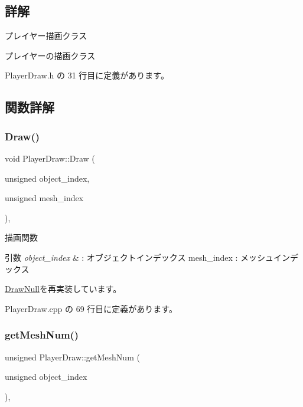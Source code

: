 \subsection{詳解}
プレイヤー描画クラス 

プレイヤーの描画クラス 

 Player\+Draw.\+h の 31 行目に定義があります。



\subsection{関数詳解}
\mbox{\label{class_player_draw_a8b9e8caa6bea7295f58a0aaddeb9458b}} 
\subsubsection{\texorpdfstring{Draw()}{Draw()}}
{\footnotesize\ttfamily void Player\+Draw\+::\+Draw (\begin{DoxyParamCaption}\item[{unsigned}]{object\+\_\+index,  }\item[{unsigned}]{mesh\+\_\+index }\end{DoxyParamCaption})\hspace{0.3cm}{\ttfamily [override]}, {\ttfamily [virtual]}}



描画関数 


\begin{DoxyParams}{引数}
{\em object\+\_\+index} & \+: オブジェクトインデックス mesh\+\_\+index \+: メッシュインデックス \\
\hline
\end{DoxyParams}


\mbox{\hyperlink{class_draw_null_afe50f6fd820b18d673f70f048743f339}{Draw\+Null}}を再実装しています。



 Player\+Draw.\+cpp の 69 行目に定義があります。

\mbox{\label{class_player_draw_ac618153d70492f73299c58a50d565431}} 
\subsubsection{\texorpdfstring{get\+Mesh\+Num()}{getMeshNum()}}
{\footnotesize\ttfamily unsigned Player\+Draw\+::get\+Mesh\+Num (\begin{DoxyParamCaption}\item[{unsigned}]{object\+\_\+index }\end{DoxyParamCaption})\hspace{0.3cm}{\ttfamily [override]}, {\ttfamily [virtual]}}



